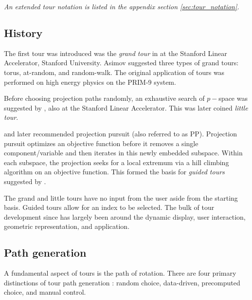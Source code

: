 \documentclass{monashthesis}
\begin{document}
\emph{An extended tour notation is listed in the appendix section
\ref{sec:tour_notation}.}

\subsection{History}\label{history}

The first tour was introduced was the \emph{grand tour} in
\textcite{asimov_grand_1985} at the Stanford Linear Accelerator,
Stanford University. Asimov suggested three types of grand tours: torus,
at-random, and random-walk. The original application of tours was
performed on high energy physics on the PRIM-9 system.

Before choosing projection paths randomly, an exhaustive search of
\(p-\)space was suggested by \textcite{mcdonald_interactive_1982}, also
at the Stanford Linear Accelerator. This was later coined \emph{little
tour}.

\textcite{friedman_projection_1974} and later
\textcite{huber_projection_1985} recommended projection pursuit (also
referred to as PP). Projection pursuit optimizes an objective function
before it removes a single component/variable and then iterates in this
newly embedded subspace. Within each subspace, the projection seeks for
a local extremum via a hill climbing algorithm on an objective function.
This formed the basis for \emph{guided tours} suggested by
\textcite{hurley_analyzing_1990}.

The grand and little tours have no input from the user aside from the
starting basis. Guided tours allow for an index to be selected. The bulk
of tour development since has largely been around the dynamic display,
user interaction, geometric representation, and application.

\subsection{Path generation}\label{sec:path_generation}

A fundamental aspect of tours is the path of rotation. There are four
primary distinctions of tour path generation
\autocite{buja_computational_2005}: random choice, data-driven,
precomputed choice, and manual control.
\end{document}
